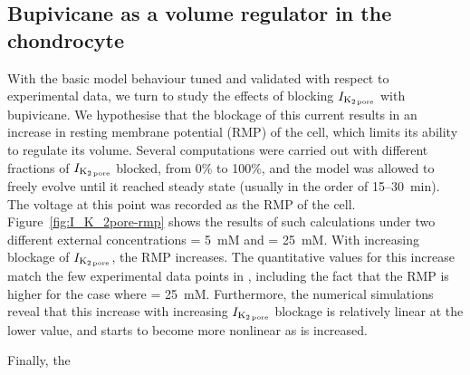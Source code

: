 \subsection*{Bupivicane as a volume regulator in the chondrocyte}

With the basic model behaviour tuned and validated with respect to
experimental data, we turn to study the effects of blocking $I_{\rm
  K_{2\, pore}}$ with bupivicane. We hypothesise that the blockage of
this current results in an increase in resting membrane potential
(RMP) of the cell, which limits its ability to regulate its
volume. Several computations were carried out with different
fractions of $I_{\rm K_{2\, pore}}$ blocked, from 0\% to 100\%, and
the model was allowed to freely evolve until it reached steady state
(usually in the order of 15--30~min). The voltage at this point was
recorded as the RMP of the cell. Figure~\ref{fig:I_K_2pore-rmp} shows
the results of such calculations under two different external
concentrations \Ko = 5~mM and \Ko = 25~mM. With increasing blockage of
$I_{\rm K_{2\, pore}}$, the RMP increases. The quantitative values for
this increase match the few experimental data points in
\citet{Clarketal2011}, including the fact that the RMP is higher for
the case where \Ko = 25~mM. Furthermore, the numerical simulations
reveal that this increase with increasing $I_{\rm K_{2\, pore}}$
blockage is relatively linear at the lower \Ko{} value, and starts to
become more nonlinear as \Ko{} is increased.

Finally, the 

